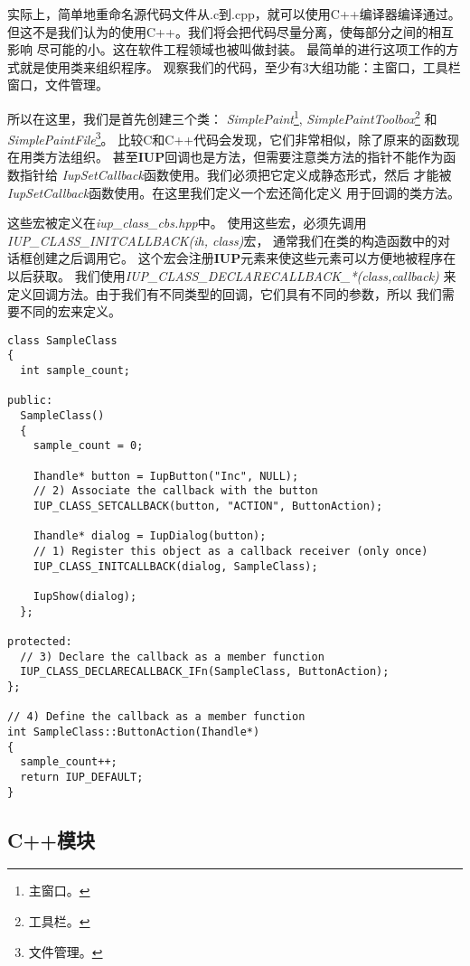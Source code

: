 \documentclass{ctexart}
\begin{document}
实际上，简单地重命名源代码文件从.c到.cpp，就可以使用C++编译器编译通过。
但这不是我们认为的使用C++。我们将会把代码尽量分离，使每部分之间的相互影响
尽可能的小。这在软件工程领域也被叫做封装。
最简单的进行这项工作的方式就是使用类来组织程序。
观察我们的代码，至少有3大组功能：主窗口，工具栏窗口，文件管理。

所以在这里，我们是首先创建三个类：
\emph{SimplePaint}\footnote{主窗口。},
\emph{SimplePaintToolbox}\footnote{工具栏。}
和\emph{SimplePaintFile}\footnote{文件管理。}。
比较C和C++代码会发现，它们非常相似，除了原来的函数现在用类方法组织。
甚至\textbf{IUP}回调也是方法，但需要注意类方法的指针不能作为函数指针给
\emph{IupSetCallback}函数使用。我们必须把它定义成静态形式，然后
才能被\emph{IupSetCallback}函数使用。在这里我们定义一个宏还简化定义
用于回调的类方法。

这些宏被定义在\emph{iup\_class\_cbs.hpp}中。
使用这些宏，必须先调用
\emph{IUP\_CLASS\_INITCALLBACK(ih, class)}宏，
通常我们在类的构造函数中的对话框创建之后调用它。
这个宏会注册\textbf{IUP}元素来使这些元素可以方便地被程序在以后获取。
我们使用\emph{IUP\_CLASS\_DECLARECALLBACK\_*(class,callback)}
来定义回调方法。由于我们有不同类型的回调，它们具有不同的参数，所以
我们需要不同的宏来定义。

\lstset{language=C}
\begin{lstlisting}
class SampleClass
{
  int sample_count;
  
public:
  SampleClass()
  {
    sample_count = 0;
    
    Ihandle* button = IupButton("Inc", NULL);
    // 2) Associate the callback with the button
    IUP_CLASS_SETCALLBACK(button, "ACTION", ButtonAction);

    Ihandle* dialog = IupDialog(button);
    // 1) Register this object as a callback receiver (only once)
    IUP_CLASS_INITCALLBACK(dialog, SampleClass);

    IupShow(dialog);
  };

protected:
  // 3) Declare the callback as a member function
  IUP_CLASS_DECLARECALLBACK_IFn(SampleClass, ButtonAction);
};

// 4) Define the callback as a member function
int SampleClass::ButtonAction(Ihandle*)
{
  sample_count++;
  return IUP_DEFAULT;
}
\end{lstlisting}



\subsection{C++模块}
\end{document}
